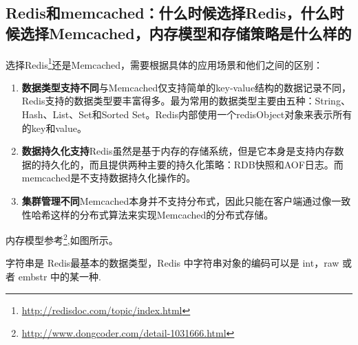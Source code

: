 \documentclass[../../../interview-questions.tex]{subfiles}
\begin{document}
\subsection{Redis和memcached：什么时候选择Redis，什么时候选择Memcached，内存模型和存储策略是什么样的}

选择Redis\footnote{\url{http://redisdoc.com/topic/index.html}}还是Memcached，需要根据具体的应用场景和他们之间的区别：

\begin{enumerate}
\item {\textbf{数据类型支持不同}}与Memcached仅支持简单的key-value结构的数据记录不同，Redis支持的数据类型要丰富得多。最为常用的数据类型主要由五种：String、Hash、List、Set和Sorted Set。Redis内部使用一个redisObject对象来表示所有的key和value。
\item {\textbf{数据持久化支持}}Redis虽然是基于内存的存储系统，但是它本身是支持内存数据的持久化的，而且提供两种主要的持久化策略：RDB快照和AOF日志。而memcached是不支持数据持久化操作的。
\item {\textbf{集群管理不同}}Memcached本身并不支持分布式，因此只能在客户端通过像一致性哈希这样的分布式算法来实现Memcached的分布式存储。
\end{enumerate}                                  

内存模型参考\footnote{\url{http://www.dongcoder.com/detail-1031666.html}},如图所示。

字符串是 Redis最基本的数据类型，Redis 中字符串对象的编码可以是 int，raw 或者 embstr 中的某一种.
\end{document}
